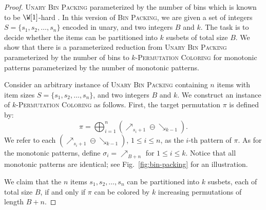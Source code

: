 \begin{proof}
  \textsc{Unary Bin Packing} parameterized by the number of bins which is
  known to be $\W[1]$-hard \cite{DBLP:journals/jcss/JansenKMS13}.
  In this version of \textsc{Bin Packing}, we are given a set of integers
  $S = \{s_1, s_2, \dots, s_n\}$
  encoded in unary, and two integers $B$ and $k$.
  The task is to decide whether the items can be partitioned into $k$ susbets of
  total size $B$.
  We show that there is a parameterized reduction from
  \textsc{Unary Bin Packing} parameterized by the number of bins to
  \textsc{$k$-Permutation Coloring} for monotonic patterns
  parameterized by the number of monotonic patterns.

  Consider an arbitrary instance of \textsc{Unary Bin Packing} containing
  $n$ items with item sizes $S = \{s_1, s_2, \dots, s_n\}$,
  and two integers $B$ and $k$.
  We construct an instance of \textsc{$k$-Permutation Coloring}
  as follows.
  First, the target permutation $\pi$ is defined by:
  $$
  \pi =
    \bigoplus_{i=1}^{n} \left(\mathbf{\nearrow}_{s_i+1} \ominus
                              \mathbf{\searrow}_{k-1}\right)
    \text{.}
  $$
  We refer to each
  $\left(\mathbf{\nearrow}_{s_i+1} \ominus \mathbf{\searrow}_{k-1}\right)$,
  $1 \leq i \leq n$,
  as the $i$-th pattern of $\pi$.
  As for the monotonic patterns,
  define $\sigma_i = {\nearrow}_{B+n}$
  for $1 \leq i \leq k$.
  Notice that all monotonic patterns are identical;
  see Fig.~\ref{fig:bin-packing} for an illustration.

  

  We claim that the $n$ items $s_1, s_2, \dots, s_n$
  can be partitioned into $k$ susbets, each of total size $B$,
  if and only if
  $\pi$ can be colored by $k$ increasing permutations of length $B+n$.


\end{proof}
